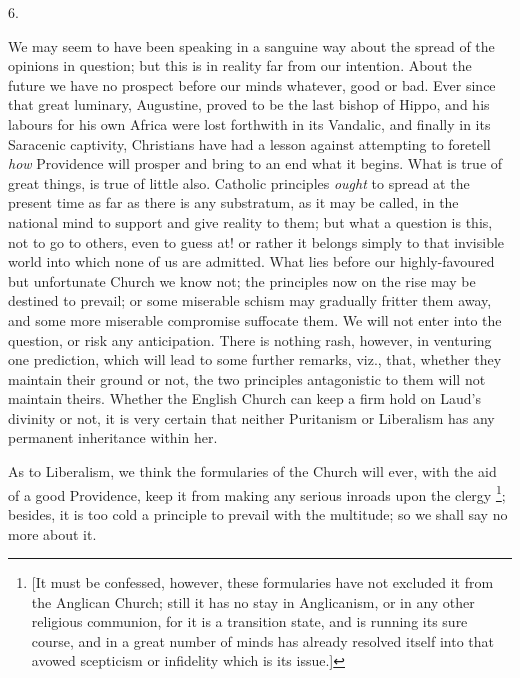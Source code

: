6.

We may seem to have been speaking in a sanguine
way about the spread of the opinions in question; but this is in
reality far from our intention. About the future we have no prospect
before our minds whatever, good or bad. Ever since that great
luminary, Augustine, proved to be the last bishop of Hippo, and his
labours for his own Africa were lost forthwith in its Vandalic, and
finally in its Saracenic captivity, Christians have had a lesson
against attempting to foretell \emph{how} Providence will prosper and
bring to an end what it begins. What is true of great things, is true
of little also. Catholic principles \emph{ought} to spread at the
present time as far as there is any substratum, as it may be called,
in the national mind to support and give reality to them; but what a
question is this, not to go to others, even to guess at! or rather it
belongs simply to that invisible world into which none of us are
admitted. What lies before our highly-favoured but unfortunate Church
we know not; the principles now on the rise may be destined to
prevail; or some miserable schism may gradually fritter them away, and
some more miserable compromise suffocate them. We will not enter into
the question, or risk any anticipation. There is nothing rash,
however, in venturing one prediction, which will lead to some further
remarks, viz., that, whether they maintain their ground or not, the
two principles antagonistic to them will not maintain theirs. Whether
the English Church can keep a firm hold on Laud's divinity or
not, it is very certain that neither Puritanism or Liberalism has any
permanent inheritance within her.

As to Liberalism, we think the formularies of the
Church will ever, with the aid of a good Providence, keep it from
making any serious inroads upon the clergy \footnote{[It must be confessed, however, these formularies have not excluded it
from the Anglican Church; still it has no stay in Anglicanism, or in
any other religious communion, for it is a transition state, and is
running its sure course, and in a great number of minds has already
resolved itself into that avowed scepticism or infidelity which is its
issue.]}; besides, it is too cold a principle to prevail with the
multitude; so we shall say no more about it.

